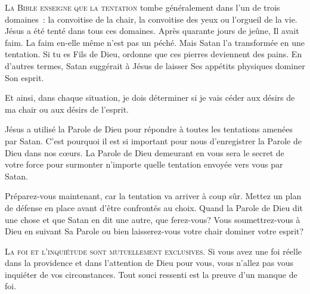 \lettrine[findent=-0.1em]{L}{a Bible enseigne que la tentation}  tombe généralement
 dans l'un de trois domaines~: la convoitise de la chair,
 la convoitise des yeux ou l'orgueil de la vie. Jésus a été tenté
 dans tous ces domaines. Après quarante jours de jeûne, Il avait faim.
 La faim en-elle même n'est pas un péché. Mais Satan l'a transformée
 en une tentation. \og Si tu es Fils de Dieu, ordonne que ces pierres
 deviennent des pains. \fg{} 
 En d'autres termes, Satan suggérait à Jésus de laisser
 Ses appétits physiques dominer Son esprit. 


Et ainsi, dans chaque situation, je dois déterminer si je vais céder
 aux désirs de ma chair ou aux désirs de l'esprit. 

Jésus a utilisé la Parole de Dieu pour répondre à toutes les tentations
 amenées par Satan. C'est pourquoi il est si important pour nous d'enregistrer
 la Parole de Dieu dans nos cœurs. La Parole de Dieu demeurant en vous
 sera le secret de votre force pour surmonter n'importe quelle tentation
 envoyée vers vous par Satan. 

Préparez-vous maintenant, car la tentation va arriver à coup sûr.
 Mettez un plan de défense en place avant d'être confrontés au choix.
 Quand la Parole de Dieu dit une chose et que Satan en dit une autre,
 que ferez-vous? Vous soumettrez-vous à Dieu en suivant Sa Parole
 ou bien laisserez-vous votre chair dominer votre esprit? 

\dvrule







\lettrine{L}{a foi et l'inquiétude sont mutuellement exclusives.}
 Si vous avez une foi réelle dans la providence et dans l'attention
 de Dieu pour vous, vous n'allez pas vous inquiéter de vos circonstances.
 Tout souci ressenti est la preuve d'un manque de foi. 

